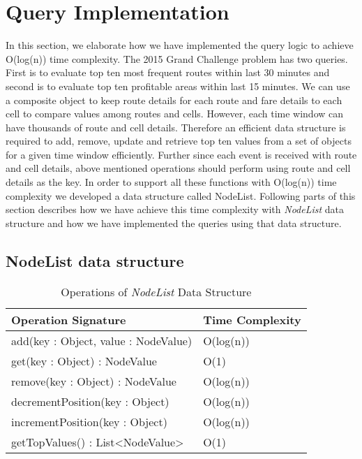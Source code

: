 \section{Query Implementation}
In this section, we elaborate how we have implemented the query logic to achieve O(log(n)) time complexity. The 2015 Grand Challenge problem has two queries. First is to evaluate top ten most frequent routes within last 30 minutes and second is to evaluate top ten profitable areas within last 15 minutes. We can use a composite object to keep route details for each route and fare details to each cell to compare values among routes and cells. However, each time window can have thousands of route and cell details. Therefore an efficient data structure is required to add, remove, update and retrieve top ten values from a set of objects for a given time window efficiently. Further since each event is received with route and cell details, above mentioned operations should perform using route and cell details as the key. In order to support all these functions with O(log(n)) time complexity we developed a data structure called NodeList. Following parts of this section describes how we have achieve this time complexity with \textit{NodeList} data structure and how we have implemented the queries using that data structure.

\subsection{NodeList data structure}

\begin{table}
\centering
\caption{Operations of \textit{NodeList} Data Structure}
\begin{tabular}{|l|l|} \hline
Operation Signature & Time Complexity \\ \hline \hline
add(key : Object, value : NodeValue) & O(log(n)) \\ \hline 
get(key : Object) : NodeValue & O(1) \\ \hline
remove(key : Object) : NodeValue & O(log(n)) \\ \hline
decrementPosition(key : Object) & O(log(n)) \\ \hline
incrementPosition(key : Object) & O(log(n)) \\ \hline
getTopValues() : List<NodeValue> & O(1) \\ \hline
\end{tabular}
\end{table}
